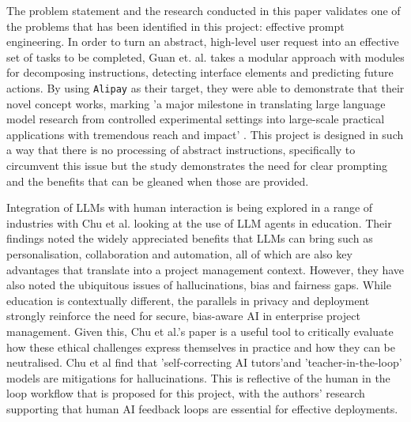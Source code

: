 \documentclass{report}
\begin{document}
The problem statement and the research conducted in this paper validates one of the problems that has been identified in this project: effective prompt engineering. In order to turn an abstract, high-level user request into an effective set of tasks to be completed, Guan et. al. takes a modular approach with modules for decomposing instructions, detecting interface elements and predicting future actions. By using \texttt{Alipay} as their target, they were able to demonstrate that their novel concept works, marking 'a major milestone in translating large language model research from controlled experimental settings into large-scale practical applications with tremendous reach and impact' \parencite{guanIntelligentVirtualAssistants2023}. This project is designed in such a way that there is no processing of abstract instructions, specifically to circumvent this issue but the study demonstrates the need for clear prompting and the benefits that can be gleaned when those are provided.

Integration of LLMs with human interaction is being explored in a range of industries with Chu et al. looking at the use of LLM agents in education. Their findings noted the widely appreciated benefits that LLMs can bring such as personalisation, collaboration and automation, all of which are also key advantages that translate into a project management context. However, they have also noted the ubiquitous issues of hallucinations, bias and fairness gaps. While education is contextually different, the parallels in privacy and deployment strongly reinforce the need for secure, bias-aware AI in enterprise project management. Given this, Chu et al.'s paper is a useful tool to critically evaluate how these ethical challenges express themselves in practice and how they can be neutralised. Chu et al find that 'self-correcting AI tutors'and 'teacher-in-the-loop' models are mitigations for hallucinations. This is reflective of the human in the loop workflow that is proposed for this project, with the authors' research supporting that human AI feedback loops are essential for effective deployments.
\end{document}
